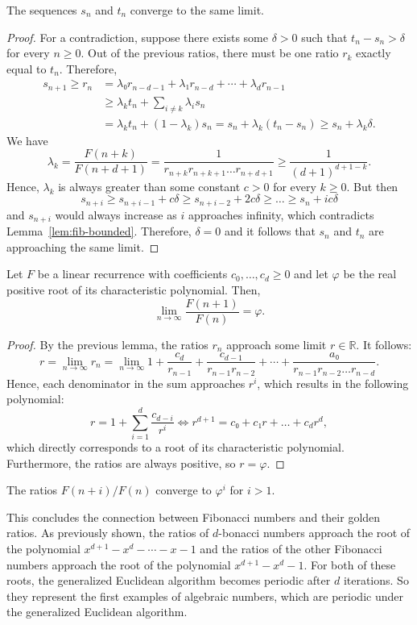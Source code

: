 \begin{lemma}
  The sequences $s_n$ and $t_n$ converge to the same limit.
\end{lemma}

\begin{proof}
  For a contradiction, suppose there exists some $δ > 0$ such that $t_n - s_n > δ$ for every $n ≥ 0$.
  Out of the previous ratios, there must be one ratio $r_k$ exactly equal to $t_n$.
  Therefore,
  \begin{align*}
    s_{n+1} ≥ r_n & = λ₀ r_{n-d-1} + λ₁ r_{n-d} + ⋯ + λ_d r_{n-1} \\
                  & ≥ λ_k t_n + \sum_{i ≠ k} λ_i s_n \\
                  & = λ_k t_n + (1 - λ_k) s_n = s_n + λ_k (t_n - s_n) ≥ s_n + λ_k δ.
  \end{align*}
  We have
  \[
    λ_k = \frac{F(n+k)}{F(n+d+1)} = \frac{1}{r_{n+k} r_{n+k+1} \dots r_{n+d+1}} ≥ \frac{1}{(d+1)^{d+1-k}}.
  \]
  Hence, $λ_k$ is always greater than some constant $c > 0$ for every $k ≥ 0$.
  But then
  \[
    s_{n+i} ≥ s_{n+i-1} + c δ ≥ s_{n+i-2} + 2c δ ≥ \dots ≥ s_n + i c δ
  \]
  and $s_{n+i}$ would always increase as $i$ approaches infinity,
  which contradicts Lemma~\ref{lem:fib-bounded}.
  Therefore, $δ = 0$ and it follows that $s_n$ and $t_n$ are approaching the same limit.
\end{proof}

\begin{theorem}
  Let $F$ be a linear recurrence with coefficients $c_0, \dots, c_d ≥ 0$
  and let $φ$ be the real positive root of its characteristic polynomial.
  Then,
  \[
    \lim_{n \to \infty} \frac{F(n + 1)}{F(n)} = φ.
  \]
\end{theorem}

\begin{proof}
  By the previous lemma, the ratios $r_n$ approach some limit $r ∈ ℝ$. It follows:
  \[
    r
    = \lim_{n → ∞} r_n
    = \lim_{n → ∞} 1 + \frac{c_d}{r_{n-1}} + \frac{c_{d-1}}{r_{n-1} r_{n-2}} + ⋯ + \frac{a₀}{r_{n-1} r_{n-2} \dots r_{n-d}}.
  \]
  Hence, each denominator in the sum approaches $r^i$,
  which results in the following polynomial:
  \[
    r = 1 + \sum_{i = 1}^d \frac{c_{d - i}}{r^i}
    \iff
    r^{d+1} = c₀ + c₁ r + \dots + c_d r^d,
  \]
  which directly corresponds to a root of its characteristic polynomial.
  Furthermore, the ratios are always positive, so $r = φ$.
\end{proof}

\begin{corollary}
  The ratios $F(n + i) / F(n)$ converge to $φ^i$ for $i > 1$.
\end{corollary}

This concludes the connection between Fibonacci numbers and their golden ratios.
As previously shown, the ratios of $d$-bonacci numbers approach the root of the polynomial $x^{d+1} - x^d - ⋯ - x - 1$
and the ratios of the other Fibonacci numbers approach the root of the polynomial $x^{d+1} - x^d - 1$.
For both of these roots, the generalized Euclidean algorithm becomes periodic after $d$ iterations.
So they represent the first examples of algebraic numbers, which are periodic
under the generalized Euclidean algorithm.
